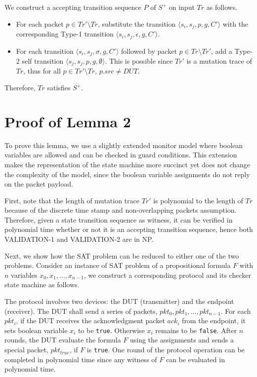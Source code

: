 We construct a accepting transition sequence $P$ of $S^+$ on input $Tr$ as
follows.
\begin{itemize}
  \item For each packet $p \in Tr' \setminus Tr$, substitute the transition
    $\langle s_i, s_j, p, g, C'\rangle$ with the corresponding Type-1
    transition $\langle s_i, s_j, \epsilon, g, C'\rangle$.
  \item For each transition $\langle s_i, s_j, \sigma, g, C'\rangle$
    followed by packet $p \in Tr\setminus Tr'$, add a Type-2 self
    transition $\langle s_j, s_j, p, g, \emptyset\rangle$. This is
    possible since $Tr'$ is a mutation trace of $Tr$, thus  for all $p \in Tr'
    \setminus Tr$, $p.src \ne DUT$.
\end{itemize}
Therefore, $Tr$ satisfies $S^+$.

\section{Proof of Lemma 2}
To prove this lemma, we use a slightly extended monitor model where boolean
variables are allowed and can be checked in guard conditions. This extension
makes the representation of the state machine more succinct yet does not change
the complexity of the model, since the boolean variable assignments do not reply
on the packet payload.

First, note that the length of mutation trace $Tr'$ is polynomial to the
length of $Tr$ because of the discrete time stamp and non-overlapping packets
assumption.
%
Therefore, given a state transition sequence as witness, it can be verified in
polynomial time whether or not it is an accepting transition sequence, hence
both VALIDATION-1 and VALIDATION-2 are in NP.

Next, we show how the SAT problem can be reduced to either one of the two
problems.
%
Consider an instance of SAT problem of a propositional formula $F$ with $n$
variables $x_0,x_1,\ldots, x_{n-1}$, we construct a corresponding protocol and
its checker state machine as follows.

The protocol involves two devices: the DUT (transmitter) and the endpoint
(receiver).
%
The DUT shall send a series of packets, $pkt_0, pkt_1,\ldots, pkt_{n-1}$.
%
For each $pkt_i$, if the DUT receives the
acknowledgment packet $ack_i$ from the endpoint, it sets boolean variable
$x_i$ to be \texttt{true}.
%
Otherwise $x_i$ remains to be \texttt{false}.
%
After $n$ rounds, the DUT evaluate the formula $F$ using the assignments and
sends a special packet, $pkt_{true}$, if $F$ is \texttt{true}.
%
One round of the protocol operation can be completed in polynomial time since
any witness of $F$ can be evaluated in polynomial time.

